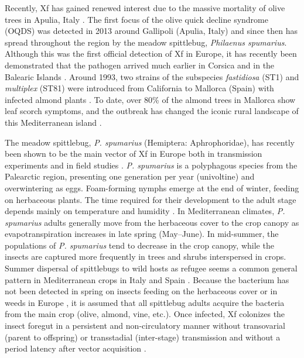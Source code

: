 Recently, Xf has gained renewed interest due to the massive mortality of
olive trees in Apulia, Italy \cite{Saponari2019}. The first focus of
the olive quick decline syndrome (OQDS) was detected in 2013 around Gallipoli
(Apulia, Italy) \cite{Saponari2013} and since then has spread
throughout the region by the meadow spittlebug, \textit{Philaenus spumarius}.
Although this was the first official detection of Xf in Europe, it has recently
been demonstrated that the pathogen arrived much earlier in Corsica
\cite{Soubeyrand2018} and in the Balearic Islands \cite{Moralejo2020}.
Around 1993, two strains of the subspecies \textit{fastidiosa} (ST1) and
\textit{multiplex} (ST81) were introduced from California to Mallorca (Spain)
with infected almond plants \cite{Moralejo2020}. To date, over 80\% of the
almond trees in Mallorca show leaf scorch symptoms, and the outbreak has
changed the iconic rural landscape of this Mediterranean island
\cite{Olmo2021}.

The meadow spittlebug,	\textit{P. spumarius} (Hemiptera: Aphrophoridae),
has recently been shown to be the main vector of Xf in Europe both in
transmission experiments and in field studies
\cite{Cornara2017,Cornara2018,lopez2022mechanical,Moralejo2019,Saponari2019}.
\textit{P. spumarius} is a polyphagous species from the Palearctic region,
presenting one generation per year (univoltine) and overwintering as eggs.
Foam-forming nymphs emerge at the end of winter, feeding on herbaceous plants.
The time required for their development to the adult stage depends mainly on
temperature and humidity
\cite{bodino2019phenology,Chmiel1979,cornara2018philaenus}. In Mediterranean
climates,  \textit{P. spumarius} adults generally move from the herbaceous
cover to the crop canopy as evapotranspiration increases in late spring
(May–June). In mid-summer, the populations of \textit{P. spumarius} tend to
decrease in the crop canopy, while the insects are captured more frequently in
trees and shrubs interspersed in crops. Summer dispersal of spittlebugs to wild
hosts as refugee seems a common general pattern in Mediterranean crops in Italy
\cite{bodino2019phenology,cornara2021natural} and Spain
\cite{morente2018distribution}. Because the bacterium has not been detected
in spring on insects feeding on the herbaceous cover or in weeds in Europe
\cite{bodino2019phenology,cornara2018philaenus,Olmo2021}, it is assumed that
all spittlebug adults acquire the bacteria from the main crop (olive, almond,
vine, etc.). Once infected, Xf colonizes the insect foregut in a persistent and
non-circulatory manner without transovarial (parent to offspring) or
transstadial (inter-stage) transmission
\cite{Almeida2003,freitag1951host,purcell1979evidence} and without
a period latency after vector acquisition \cite{Almeida2015,freitag1951host}.

